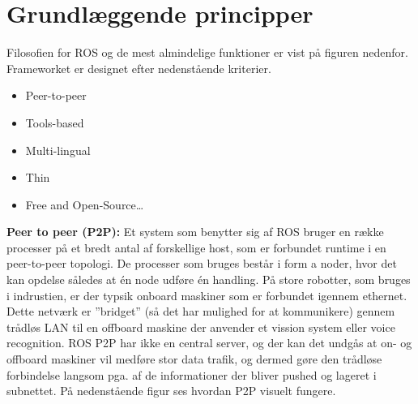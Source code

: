 \section{Grundlæggende principper}
Filosofien for ROS og de mest almindelige funktioner er vist på figuren nedenfor.
Frameworket er designet efter nedenstående kriterier. 
\begin{itemize}  
\item Peer-to-peer
\item Tools-based 
\item Multi-lingual
\item Thin
\item Free and Open-Source\ldots 
\end{itemize}
\textbf{Peer to peer (P2P):} Et system som benytter sig af ROS bruger en række processer på et bredt antal af forskellige host, som er forbundet runtime i en peer-to-peer topologi. De processer som bruges består i form a noder, hvor det kan opdelse således at én node udføre én handling. På store robotter, som bruges i indrustien, er der typsik onboard maskiner som er forbundet igennem ethernet. Dette netværk er ''bridget'' (så det har mulighed for at kommunikere) gennem trådløs LAN til en offboard maskine der anvender et vission system eller voice recognition. ROS P2P har ikke en central server, og der kan det undgås at on- og offboard maskiner vil medføre stor data trafik, og dermed gøre den trådløse forbindelse langsom pga. af de informationer der bliver pushed og lageret i subnettet. På nedenstående figur ses hvordan P2P visuelt fungere. 

